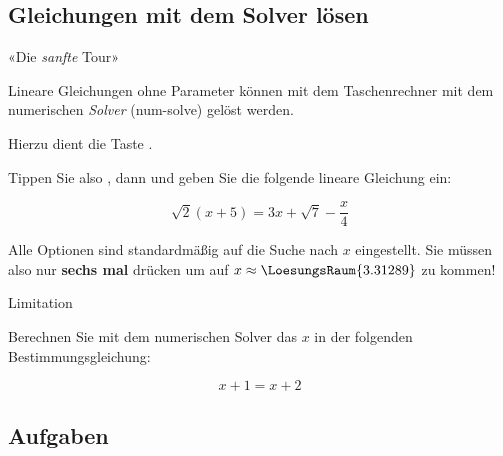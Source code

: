 
\subsection{Gleichungen mit dem Solver lösen}

«Die \textit{sanfte} Tour»

Lineare Gleichungen ohne Parameter können mit dem Taschenrechner mit dem numerischen
\textit{Solver} (num-solve) gelöst werden.

  Hierzu dient die Taste .

  Tippen Sie also , dann  und geben
  Sie die folgende lineare Gleichung ein:

$$\sqrt{2}(x+5) = 3x + \sqrt{7} - \frac{x}4$$

  Alle Optionen sind standardmäßig auf die Suche nach $x$
  eingestellt. Sie müssen also nur \textbf{sechs mal} 
  drücken um auf $x\approx \LoesungsRaum{3.31289}$ zu kommen!

  \begin{bemerkung}{Limitation}{}

    Berechnen Sie mit dem numerischen Solver
     das $x$ in der folgenden
    Bestimmungsgleichung:

    $$x+1=x+2$$
    

    \vspace{10mm}
    
    
  \end{bemerkung}

  \subsection*{Aufgaben}
\newpage
